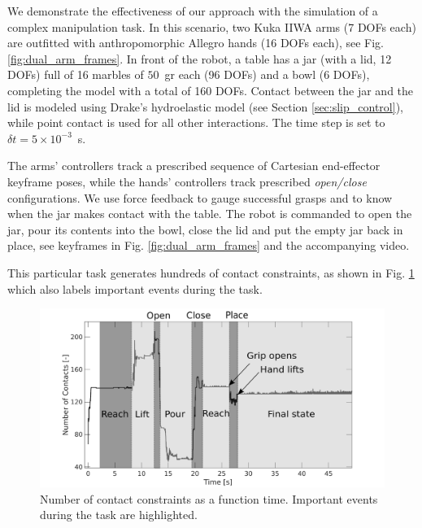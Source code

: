 We demonstrate the effectiveness of our approach with the simulation of a
complex manipulation task. In this scenario, two Kuka IIWA arms (7 DOFs each)
are outfitted with anthropomorphic Allegro hands (16 DOFs each), see Fig.
\ref{fig:dual_arm_frames}. In front of the robot, a table has a jar (with a lid,
12 DOFs) full of 16 marbles of $50$~gr each (96 DOFs) and a bowl (6 DOFs), completing the model
with a total of 160 DOFs. Contact between the jar and the lid is modeled using
Drake's hydroelastic model \cite{bib:elandt2019pressure,
bib:masterjohn2021discrete} (see Section \ref{sec:slip_control}), while point
contact is used for all other interactions. The time step is set to $\delta t=5\times 10^{-3}$~s.

The arms' controllers track a prescribed sequence of Cartesian end-effector
keyframe poses, while the hands' controllers track prescribed \emph{open/close}
configurations. We use force feedback to gauge successful grasps and to know
when the jar makes contact with the table. The robot is commanded to open the
jar, pour its contents into the bowl, close the lid and put the empty jar back
in place, see keyframes in Fig. \ref{fig:dual_arm_frames} and the accompanying
video. 

This particular task generates hundreds of contact constraints, as shown in Fig.
\ref{fig:dual_arm_contacts} which also labels important events during the task.

\begin{figure}[!h]
	\centering
    \includegraphics[width=0.9\columnwidth]{figures/dual_arm/dual_arm_contact.png}
    \caption{\label{fig:dual_arm_contacts} Number of contact constraints as a
    function time. Important events during the task are highlighted.}
\end{figure}

